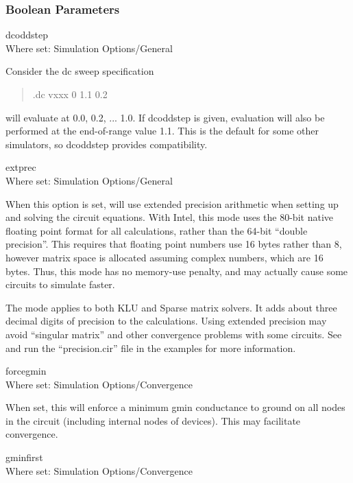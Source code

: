 \subsubsection{Boolean Parameters}

\begin{description}
\item{\et dcoddstep}\\
Where set: {\cb Simulation Options/General}

Consider the dc sweep specification   
\begin{quote}
\vt .dc vxxx 0 1.1 0.2
\end{quote}
{\WRspice} will evaluate at 0.0, 0.2, ...  1.0.  If {\et dcoddstep} is
given, evaluation will also be performed at the end-of-range value
1.1.  This is the default for some other simulators, so {\et
dcoddstep} provides compatibility.

\item{\et extprec}\\
Where set: {\cb Simulation Options/General}

When this option is set, {\WRspice} will use extended precision
arithmetic when setting up and solving the circuit equations.  With
Intel, this mode uses the 80-bit native floating point format for all
calculations, rather than the 64-bit ``double precision''.  This
requires that floating point numbers use 16 bytes rather than 8,
however matrix space is allocated assuming complex numbers, which are
16 bytes.  Thus, this mode has no memory-use penalty, and may actually
cause some circuits to simulate faster.

The mode applies to both KLU and Sparse matrix solvers.  It adds about
three decimal digits of precision to the calculations.  Using extended
precision may avoid ``singular matrix'' and other convergence problems
with some circuits.  See and run the ``{\vt precision.cir}'' file in
the examples for more information.

\item{\et forcegmin}\\
Where set: {\cb Simulation Options/Convergence}

When set, this will enforce a minimum {\et gmin} conductance to ground
on all nodes in the circuit (including internal nodes of devices). 
This may facilitate convergence.

\item{\et gminfirst}\\
Where set: {\cb Simulation Options/Convergence}


\end{description}
